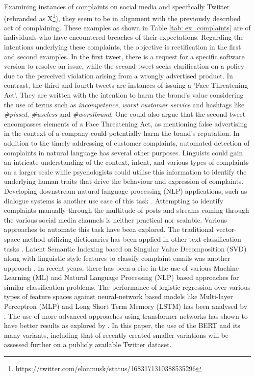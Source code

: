 Examining instances of complaints on social media and specifically Twitter (rebranded as X\footnote{https://twitter.com/elonmusk/status/1683171310388535296}), they seem to be in alignment with the previously described act of complaining. These examples as shown in Table \ref{tab: ex_complaints} are of individuals who have encountered breaches of their expectations. Regarding the intentions underlying these complaints, the objective is rectification in the first and second examples. In the first tweet, there is a request for a specific software version to resolve an issue, while the second tweet seeks clarification on a policy due to the perceived violation arising from a wrongly advertised product. In contrast, the third and fourth tweets are instances of issuing a 'Face Threatening Act'. They are written with the intention to harm the brand's value considering the use of terms such as \textit{incompetence}, \textit{worst customer service} and hashtags like \textit{\#pissed}, \textit{\#useless} and \textit{\#worstbrand}. One could also argue that the second tweet encompasses elements of a Face Threatening Act, as mentioning false advertising in the context of a company could potentially harm the brand's reputation.
\newline \newline
In addition to the timely addressing of customer complaints, automated detection of complaints in natural language has several other purposes. Linguists could gain an intricate understanding of the context, intent, and various types of complaints on a larger scale while psychologists could utilise this information to identify the underlying human traits that drive the behaviour and expression of complaints. Developing downstream natural language processing (NLP) applications, such as dialogue systems is another use case of this task \cite{preotiuc-pietro_automatically_2019}.
\newline \newline
Attempting to identify complaints manually through the multitude of posts and streams coming through the various social media channels is neither practical nor scalable. Various approaches to automate this task have been explored. The traditional vector-space method utilizing dictionaries has been applied in other text classification tasks \cite{liang_dictionary-based_2006}. Latent Semantic Indexing based on Singular Value Decomposition (SVD) along with linguistic style features to classify complaint emails was another approach \cite{coussement_improving_2008}. In recent years, there has been a rise in the use of various Machine Learning (ML) and Natural Language Processing (NLP) based approaches for similar classification problems. The performance of logistic regression over various types of feature spaces against neural-network based models like Multi-layer Perceptron (MLP) and Long Short Term Memory (LSTM) has been analysed by \cite{preotiuc-pietro_automatically_2019}. The use of more advanced approaches using transformer networks has shown to have better results as explored by \cite{jin_complaint_2020}. In this paper, the use of the BERT and its many variants, including that of recently created smaller variations will be assessed further on a publicly available Twitter dataset.

